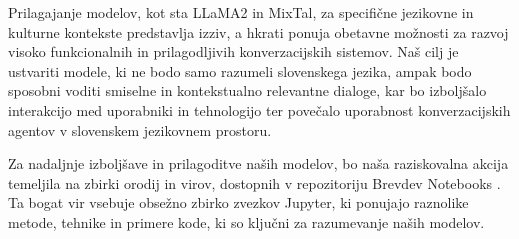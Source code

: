 \documentclass[fleqn,moreauthors,10pt]{ds_report}
\begin{document}
Prilagajanje modelov, kot sta LLaMA2 in MixTal, za specifične jezikovne in kulturne kontekste predstavlja izziv, a hkrati ponuja obetavne možnosti za razvoj visoko funkcionalnih in prilagodljivih konverzacijskih sistemov. Naš cilj je ustvariti modele, ki ne bodo samo razumeli slovenskega jezika, ampak bodo sposobni voditi smiselne in kontekstualno relevantne dialoge, kar bo izboljšalo interakcijo med uporabniki in tehnologijo ter povečalo uporabnost konverzacijskih agentov v slovenskem jezikovnem prostoru.

Za nadaljnje izboljšave in prilagoditve naših modelov, bo naša raziskovalna akcija temeljila na zbirki orodij in virov, dostopnih v repozitoriju Brevdev Notebooks \cite{brevdev}. Ta bogat vir vsebuje obsežno zbirko zvezkov Jupyter, ki ponujajo raznolike metode, tehnike in primere kode, ki so ključni za razumevanje naših modelov.


\end{document}

